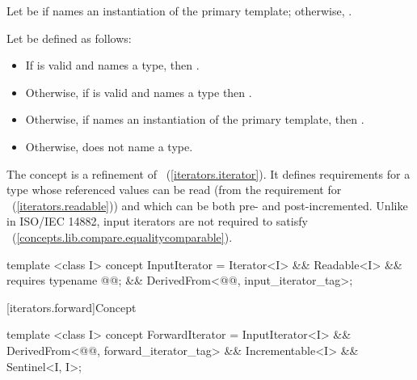 \begin{addedblock}
\pnum
Let  be  if 
names an instantiation of the primary template; otherwise, .

\pnum
Let  be defined as follows:
\begin{itemize}
\item If  is valid
  and names a type, then .
\item Otherwise, if  is valid
  and names a type then .
\item Otherwise, if  names an instantiation of
  the primary template, then .
\item Otherwise,  does not name a type.
\end{itemize}
\end{addedblock}

\pnum
The  concept is a refinement of
~(\ref{iterators.iterator}). It defines requirements for a type
whose referenced values can be read (from the requirement for
~(\ref{iterators.readable})) and which can be both pre- and
post-incremented.
\enternote Unlike in ISO/IEC 14882, input iterators are not required to satisfy
~(\ref{concepts.lib.compare.equalitycomparable}).\exitnote

%
\begin{codeblock}
  template <class I>
  concept InputIterator =
    Iterator<I> &&
    Readable<I> &&
    requires { typename @@; } &&
    DerivedFrom<@@, input_iterator_tag>;
\end{codeblock}

\setcounter{subsubsection}{12}
[iterators.forward]{Concept }


%
\begin{codeblock}
  template <class I>
  concept ForwardIterator =
    InputIterator<I> &&
    DerivedFrom<@@, forward_iterator_tag> &&
    Incrementable<I> &&
    Sentinel<I, I>;
\end{codeblock}

